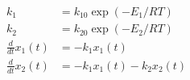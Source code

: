 \begin{equation}
  \begin{aligned}
    k_1                  & = k_{10} \exp(-E_1 / RT)
    \\
    k_2                  & = k_{20} \exp(-E_2 / RT)
    \\
    \frac{d}{dt}x_{1}(t) & = - k_1 x_1(t)
    \\
    \frac{d}{dt}x_{2}(t) & = - k_1 x_1(t) - k_2 x_2(t)
  \end{aligned}
  \label{eq:batch_reactor01_1}
\end{equation}
